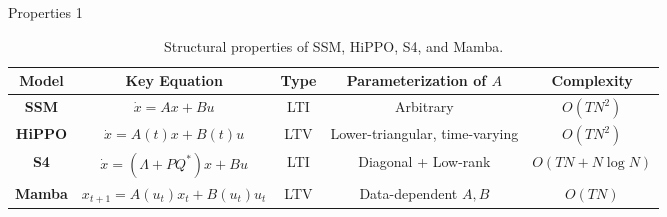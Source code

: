 \documentclass[xcolor=dvipsnames,aspectratio=169]{beamer}
\begin{document}
        \begin{frame}{Properties 1} 
            \footnotesize
            \renewcommand{\arraystretch}{1.4}
            \setlength{\tabcolsep}{4pt}
            \begin{table}[h!]
                \centering
                \begin{tabular}{|c|c|c|c|c|}
                    \hline
                    \textbf{Model} & \textbf{Key Equation} & \textbf{Type} & \textbf{Parameterization of $A$} & \textbf{Complexity} \\
                    \hline
                    \textbf{SSM} &
                    $\dot{x} = A x + B u$ &
                    LTI &
                    Arbitrary &
                    $O(TN^{2})$ \\
                    \hline
                    \textbf{HiPPO} &
                    $\dot{x} = A(t) x + B(t) u$ &
                    LTV &
                    Lower-triangular, time-varying &
                    $O(TN^{2})$ \\
                    \hline
                    \textbf{S4} &
                    $\dot{x} = (\Lambda + P Q^{*})x + Bu$ &
                    LTI &
                    Diagonal + Low-rank &
                    $O(TN + N\log N)$ \\
                    \hline
                    \textbf{Mamba} &
                    $x_{t+1} = A(u_t)x_t + B(u_t)u_t$ &
                    LTV &
                    Data-dependent $A,B$ &
                    $O(TN)$ \\
                    \hline
                \end{tabular}
                \caption{Structural properties of SSM, HiPPO, S4, and Mamba.}
            \end{table}
        \end{frame}
\end{document}
